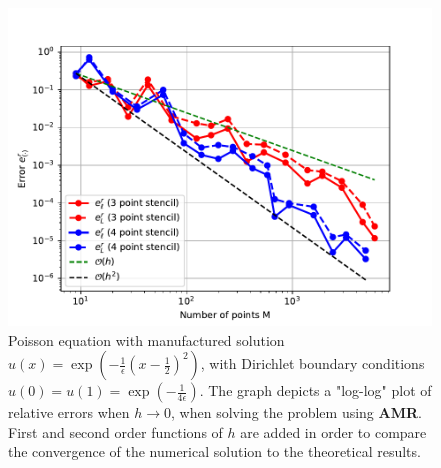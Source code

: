 \begin{figure}[t]
\centering
\includegraphics[width=0.85\linewidth]{plots/loglogtask1dAMR.pdf}
\caption{Poisson equation with manufactured solution $u(x) = \exp{\left(-\frac{1}{\epsilon}(x-\frac{1}{2})^2\right)}$, with Dirichlet boundary conditions $u(0) = u(1) = \exp{\left(-\frac{1}{4\epsilon}\right)}$. The graph depicts a "log-log" plot of relative errors when $h \rightarrow 0$, when solving the problem using \textbf{AMR}. First and second order functions of $h$ are added in order to compare the convergence of the numerical solution to the theoretical results.}
\label{fig:part1Task1dloglogAMR}
\end{figure}


\newpage
\ 
\newpage
